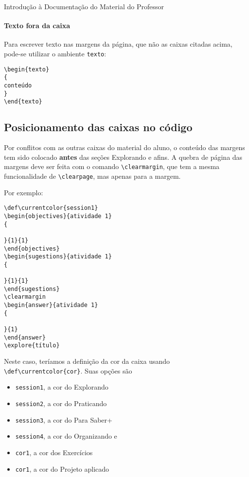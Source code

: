 \begin{apresentacao}{Introdução à Documentação do Material do Professor}
\paragraph{Texto fora da caixa}
Para escrever texto nas margens da página, que não as caixas citadas acima, pode-se utilizar o ambiente \verb|texto|:
\begin{verbatim}
\begin{texto}
{
conteúdo
}
\end{texto}
\end{verbatim}

\subsection{Posicionamento das caixas no código}

Por conflitos com as outras caixas do material do aluno, o conteúdo das margens tem sido colocado \textbf{antes} das seções Explorando e afins. A quebra de página das margens deve ser feita com o comando \verb|\clearmargin|, que tem a mesma funcionalidade de \verb|\clearpage|, mas apenas para a margem.

Por exemplo:
\begin{verbatim}
\def\currentcolor{session1}
\begin{objectives}{atividade 1}
{

}{1}{1}
\end{objectives}
\begin{sugestions}{atividade 1}
{

}{1}{1}
\end{sugestions}
\clearmargin
\begin{answer}{atividade 1}
{

}{1}
\end{answer}
\explore{título}
\end{verbatim}

Neste caso, teríamos a definição da cor da caixa usando \verb|\def\currentcolor{cor}|. Suas opções são 
\begin{itemize}
\item \verb|session1|, a cor do \textcolor{session1}{Explorando} 
\item \verb|session2|, a cor do \textcolor{session2}{Praticando}
\item \verb|session3|, a cor do \textcolor{session3}{Para Saber+}
\item \verb|session4|, a cor do \textcolor{session4}{Organizando} e
\item \verb|cor1|, a cor dos \textcolor{cor1}{Exercícios}
\item \verb|cor1|, a cor do \textcolor{cor2}{Projeto aplicado}
\end{itemize}



\end{apresentacao}

